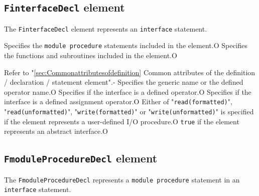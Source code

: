 \subsection{ {\tt FinterfaceDecl} element}

The {\tt FinterfaceDecl} element represents an {\tt interface} statement.


\begin{XcodeMLChildElements}
{Specifies the {\tt module procedure} statements included in the element.}{O}
{Specifies the functions and subroutines included in the element.}{O}
\end{XcodeMLChildElements}

\begin{XcodeMLAttributes}
{Refer to "\ref{sec:Commonattributesofdefinition} Common attributes of the definition / declaration / statement element".}{-}
{Specifies the generic name or the defined operator name.}{O}
{Specifies if the interface is a defined operator.}{O}
{Specifies if the interface is a defined assignment operator.}{O}
{Either of "{\tt read(formatted)}", "{\tt read(unformatted)}",
 "{\tt write(formatted)}" or "{\tt write(unformatted)}" is specified if the element represents
 a user-defined I/O procedure.}{O}
{{\tt true} if the element represents an abstract interface.}{O}
\end{XcodeMLAttributes}


\subsection{ {\tt FmoduleProcedureDecl} element}

The {\tt FmoduleProcedureDecl} represents a {\tt module procedure} statement in an {\tt interface} statement.


